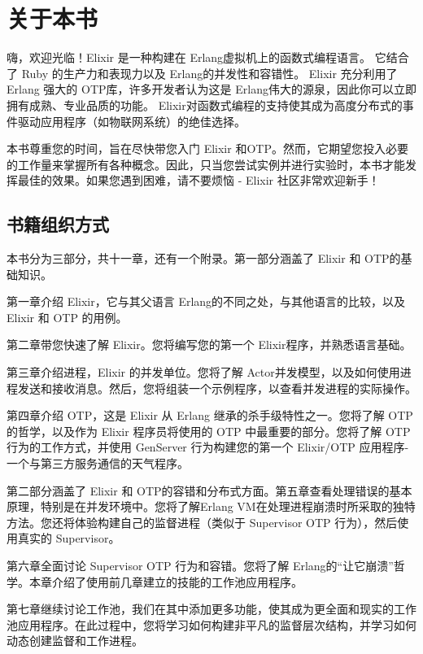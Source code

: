 \chapter*{关于本书}\label{about}

嗨，欢迎光临！Elixir 是一种构建在 Erlang虚拟机上的函数式编程语言。
它结合了 Ruby 的生产力和表现力以及 Erlang的并发性和容错性。
Elixir 充分利用了 Erlang 强大的 OTP库，许多开发者认为这是 Erlang伟大的源泉，因此你可以立即拥有成熟、专业品质的功能。
Elixir对函数式编程的支持使其成为高度分布式的事件驱动应用程序（如物联网系统）的绝佳选择。

本书尊重您的时间，旨在尽快带您入门 Elixir 和OTP。然而，它期望您投入必要的工作量来掌握所有各种概念。因此，只当您尝试实例并进行实验时，本书才能发挥最佳的效果。如果您遇到困难，请不要烦恼 - Elixir 社区非常欢迎新手！

\section*{书籍组织方式}

本书分为三部分，共十一章，还有一个附录。第一部分涵盖了 Elixir 和 OTP的基础知识。

第一章介绍 Elixir，它与其父语言 Erlang的不同之处，与其他语言的比较，以及 Elixir 和 OTP 的用例。

第二章带您快速了解 Elixir。您将编写您的第一个 Elixir程序，并熟悉语言基础。

第三章介绍进程，Elixir 的并发单位。您将了解 Actor并发模型，以及如何使用进程发送和接收消息。然后，您将组装一个示例程序，以查看并发进程的实际操作。

第四章介绍 OTP，这是 Elixir 从 Erlang 继承的杀手级特性之一。您将了解 OTP的哲学，以及作为 Elixir 程序员将使用的 OTP 中最重要的部分。您将了解 OTP行为的工作方式，并使用 GenServer 行为构建您的第一个 Elixir/OTP 应用程序- 一个与第三方服务通信的天气程序。

第二部分涵盖了 Elixir 和 OTP的容错和分布式方面。第五章查看处理错误的基本原理，特别是在并发环境中。您将了解Erlang VM在处理进程崩溃时所采取的独特方法。您还将体验构建自己的监督进程（类似于 Supervisor OTP 行为），然后使用真实的 Supervisor。

第六章全面讨论 Supervisor OTP 行为和容错。您将了解 Erlang的``让它崩溃''哲学。本章介绍了使用前几章建立的技能的工作池应用程序。

第七章继续讨论工作池，我们在其中添加更多功能，使其成为更全面和现实的工作池应用程序。在此过程中，您将学习如何构建非平凡的监督层次结构，并学习如何动态创建监督和工作进程。

